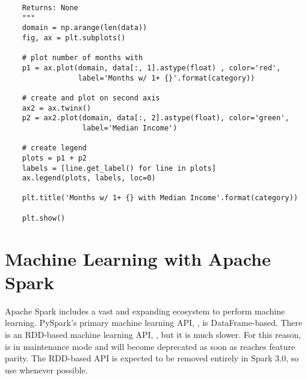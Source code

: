 \begin{problem}
\begin{lstlisting}
    Returns: None
    """
    domain = np.arange(len(data))
    fig, ax = plt.subplots()

    # plot number of months with
    p1 = ax.plot(domain, data[:, 1].astype(float) , color='red', 
                 label='Months w/ 1+ {}'.format(category))

    # create and plot on second axis
    ax2 = ax.twinx()
    p2 = ax2.plot(domain, data[:, 2].astype(float), color='green', 
                  label='Median Income')

    # create legend
    plots = p1 + p2
    labels = [line.get_label() for line in plots]
    ax.legend(plots, labels, loc=0)

    plt.title('Months w/ 1+ {} with Median Income'.format(category))

    plt.show()
\end{lstlisting}
\label{prob:spark-df-hard}
\end{problem}
	
\section*{Machine Learning with Apache Spark}

Apache Spark includes a vast and expanding ecosystem to perform machine learning. 
PySpark's primary machine learning API, , is DataFrame-based.
There is an RDD-based machine learning API, , but it is much slower.
For this reason,  is in maintenance mode and will become deprecated as soon as  reaches feature parity. 
The RDD-based API is expected to be removed entirely in Spark 3.0, so use  whenever possible.

